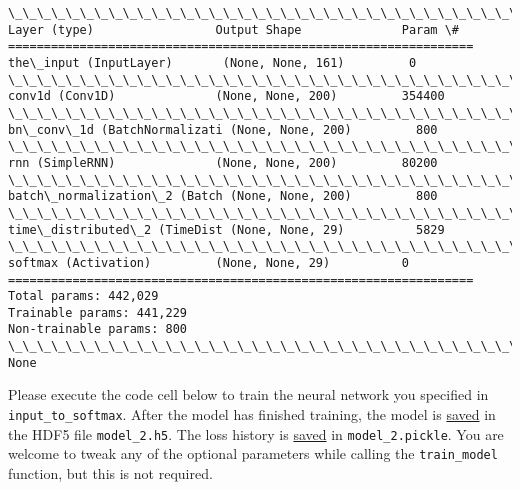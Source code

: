\documentclass[11pt]{article}
\begin{document}
    \begin{Verbatim}[commandchars=\\\{\}]
\_\_\_\_\_\_\_\_\_\_\_\_\_\_\_\_\_\_\_\_\_\_\_\_\_\_\_\_\_\_\_\_\_\_\_\_\_\_\_\_\_\_\_\_\_\_\_\_\_\_\_\_\_\_\_\_\_\_\_\_\_\_\_\_\_
Layer (type)                 Output Shape              Param \#   
=================================================================
the\_input (InputLayer)       (None, None, 161)         0         
\_\_\_\_\_\_\_\_\_\_\_\_\_\_\_\_\_\_\_\_\_\_\_\_\_\_\_\_\_\_\_\_\_\_\_\_\_\_\_\_\_\_\_\_\_\_\_\_\_\_\_\_\_\_\_\_\_\_\_\_\_\_\_\_\_
conv1d (Conv1D)              (None, None, 200)         354400    
\_\_\_\_\_\_\_\_\_\_\_\_\_\_\_\_\_\_\_\_\_\_\_\_\_\_\_\_\_\_\_\_\_\_\_\_\_\_\_\_\_\_\_\_\_\_\_\_\_\_\_\_\_\_\_\_\_\_\_\_\_\_\_\_\_
bn\_conv\_1d (BatchNormalizati (None, None, 200)         800       
\_\_\_\_\_\_\_\_\_\_\_\_\_\_\_\_\_\_\_\_\_\_\_\_\_\_\_\_\_\_\_\_\_\_\_\_\_\_\_\_\_\_\_\_\_\_\_\_\_\_\_\_\_\_\_\_\_\_\_\_\_\_\_\_\_
rnn (SimpleRNN)              (None, None, 200)         80200     
\_\_\_\_\_\_\_\_\_\_\_\_\_\_\_\_\_\_\_\_\_\_\_\_\_\_\_\_\_\_\_\_\_\_\_\_\_\_\_\_\_\_\_\_\_\_\_\_\_\_\_\_\_\_\_\_\_\_\_\_\_\_\_\_\_
batch\_normalization\_2 (Batch (None, None, 200)         800       
\_\_\_\_\_\_\_\_\_\_\_\_\_\_\_\_\_\_\_\_\_\_\_\_\_\_\_\_\_\_\_\_\_\_\_\_\_\_\_\_\_\_\_\_\_\_\_\_\_\_\_\_\_\_\_\_\_\_\_\_\_\_\_\_\_
time\_distributed\_2 (TimeDist (None, None, 29)          5829      
\_\_\_\_\_\_\_\_\_\_\_\_\_\_\_\_\_\_\_\_\_\_\_\_\_\_\_\_\_\_\_\_\_\_\_\_\_\_\_\_\_\_\_\_\_\_\_\_\_\_\_\_\_\_\_\_\_\_\_\_\_\_\_\_\_
softmax (Activation)         (None, None, 29)          0         
=================================================================
Total params: 442,029
Trainable params: 441,229
Non-trainable params: 800
\_\_\_\_\_\_\_\_\_\_\_\_\_\_\_\_\_\_\_\_\_\_\_\_\_\_\_\_\_\_\_\_\_\_\_\_\_\_\_\_\_\_\_\_\_\_\_\_\_\_\_\_\_\_\_\_\_\_\_\_\_\_\_\_\_
None

    \end{Verbatim}

    Please execute the code cell below to train the neural network you
specified in \texttt{input\_to\_softmax}. After the model has finished
training, the model is
\href{https://keras.io/getting-started/faq/\#how-can-i-save-a-keras-model}{saved}
in the HDF5 file \texttt{model\_2.h5}. The loss history is
\href{https://wiki.python.org/moin/UsingPickle}{saved} in
\texttt{model\_2.pickle}. You are welcome to tweak any of the optional
parameters while calling the \texttt{train\_model} function, but this is
not required.
\end{document}
